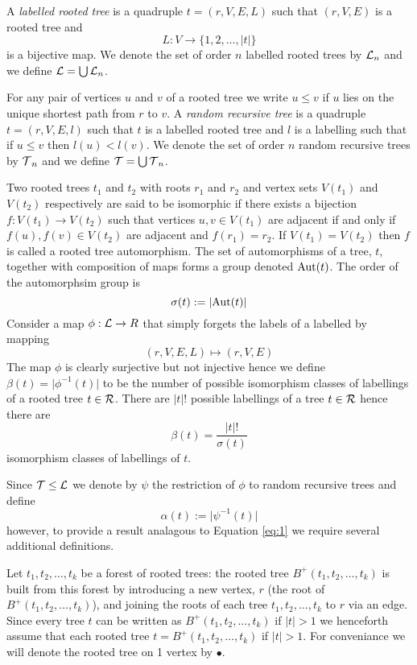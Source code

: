  A \emph{labelled rooted tree} is a quadruple $t = (r,V,E,L)$ such that $(r,V,E)$ is a rooted tree and 
 \[L: V \longrightarrow \{1,2,\dots,\lvert t \rvert\}\] 
is a bijective map.  We denote the set of order $n$ labelled rooted trees by $\operatorname{\mathcal{L}}_n$ and we define $\operatorname{\mathcal{L}} = \bigcup \operatorname{\mathcal{L}}_n$.      

For any pair of vertices $u$ and $v$ of a rooted tree we write $u \leq v$ if $u$ lies on the unique shortest path from $r$ to $v$.  A 
\emph{random recursive tree} is a quadruple $t = (r,V,E,l)$ such that $t$ is a labelled rooted tree and $l$ is a labelling 
such that if $u \leq v$ then $l(u) < l(v)$. 
We denote the set of order $n$ random recursive trees by $\operatorname{\mathcal{T}}_n$ and we define $\operatorname{\mathcal{T}} = \bigcup \operatorname{\mathcal{T}}_n$. 


Two rooted trees $t_1$ and $t_2$ with roots $r_1$ and $r_2$ and vertex sets $V(t_1)$ and $V(t_2)$ respectively are said to be
isomorphic if there exists a bijection $f: V(t_1) \rightarrow V(t_2)$ such that 
vertices $u,v \in V(t_1)$ are adjacent if and only if $f(u),f(v) \in V(t_2)$ are adjacent and $f(r_1) = r_2$. If 
$V(t_1) = V(t_2)$ then $f$ is called a rooted tree automorphism.  The set of automorphisms of a tree, $t$, together with 
composition of maps forms a group denoted $\operatorname{Aut}(t)$.  The order of the automorphsim group is 
\[\sigma(t) := \lvert \operatorname{Aut}(t) \rvert\] 
Consider a map $\phi: \operatorname{\mathcal{L}} \rightarrow R$ that simply forgets the labels of a labelled by mapping
\[
 (r,V,E,L) \mapsto (r,V,E)
\]
The map $\phi$ is clearly surjective but not injective hence we define $\beta(t) = \lvert \phi^{-1}(t) \rvert$ to be the number of
possible isomorphism classes of labellings of a rooted tree $t \in \operatorname{\mathcal{R}}$. There are $\lvert t \rvert !$ possible labellings of a tree 
$t \in \operatorname{\mathcal{R}}$ hence there are  
\begin{equation}\label{eq:1}
  \beta(t) = \frac{\lvert t \rvert !}{\sigma(t)} 
\end{equation}
isomorphism classes of labellings of $t$.  

Since $\operatorname{\mathcal{T}} \leq \operatorname{\mathcal{L}}$ we denote by $\psi$ the restriction of $\phi$ to random recursive trees and define
\[
 \alpha(t) := \lvert \psi^{-1}(t) \rvert 
\]
however, to provide a result analagous to Equation \ref{eq:1} we require several additional definitions. 

Let $t_1,t_2,\dots,t_k$ be a forest of rooted trees: the rooted tree $B^{+}(t_1,t_2,\dots,t_k)$ is built from this forest by 
introducing a new vertex, $r$ (the root of $B^{+}(t_1,t_2,\dots,t_k)$), and joining the roots of each tree $t_1,t_2,\dots,t_k$ 
to $r$ via an edge.  Since every tree $t$ can be written as $B^{+}(t_1,t_2,\dots,t_k)$ if $\lvert t \rvert > 1$ we henceforth 
assume that each rooted tree $t = B^{+}(t_1,t_2,\dots,t_k)$ if $\lvert t \rvert >1$.  For conveniance we will denote the rooted tree on 1 vertex 
by $\bullet$.

